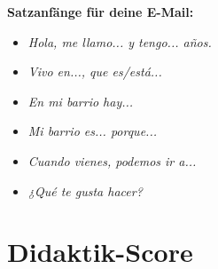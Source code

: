 \documentclass[11pt, a4paper]{article}
\newcommand{\es}[1]{\textcolor{spanisch}{\textit{#1}}}
\begin{document}
\begin{infobox}
\textbf{Satzanfänge für deine E-Mail:}

\begin{itemize}[leftmargin=2em]
    \item \es{Hola, me llamo... y tengo... años.}
    \item \es{Vivo en..., que es/está...}
    \item \es{En mi barrio hay...}
    \item \es{Mi barrio es... porque...}
    \item \es{Cuando vienes, podemos ir a...}
    \item \es{¿Qué te gusta hacer?}
\end{itemize}
\end{infobox}


\newpage
\section{Didaktik-Score}
\end{document}
